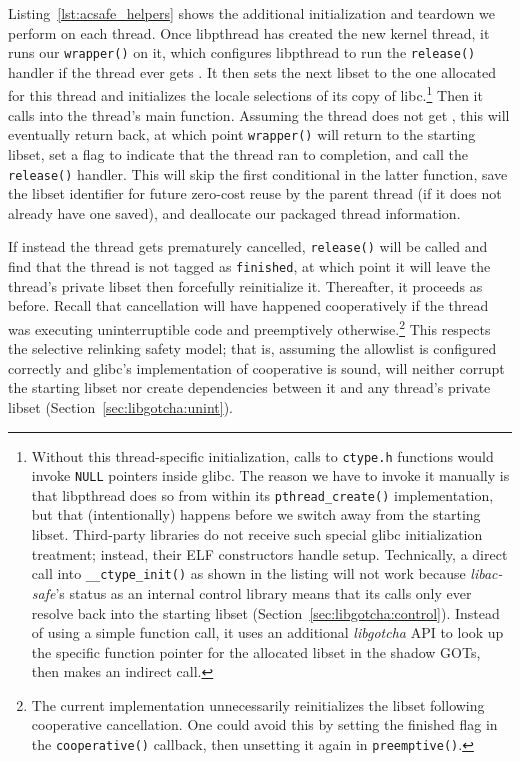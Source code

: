 Listing~\ref{lst:acsafe_helpers} shows the additional initialization and teardown we
perform on each thread.  Once libpthread has created the new kernel thread, it runs
our \texttt{wrapper()} on it, which configures libpthread to run the
\texttt{release()} handler if the thread ever gets .  It then sets the
next
libset to the one allocated for this thread and initializes the locale selections of
its copy of libc.\footnote{Without this thread-specific initialization, calls to
\texttt{ctype.h} functions would invoke \texttt{NULL} pointers inside glibc.  The
reason we have to invoke it manually is that libpthread does so from within its
\texttt{pthread\_create()} implementation, but that (intentionally) happens before we
switch away from the starting libset.  Third-party libraries do not receive such
special glibc initialization treatment; instead, their ELF constructors handle setup.
Technically, a direct call into \texttt{\_\_ctype\_init()} as shown in the listing
will not work because \textit{libac-safe}'s status as an internal control library
means that its calls only ever resolve back into the starting libset
(Section~\ref{sec:libgotcha:control}).  Instead of using a simple function call, it
uses an additional \textit{libgotcha} API to look up the specific function pointer
for the allocated libset in the shadow GOTs, then makes an indirect call.}  Then it
calls into the thread's main function.  Assuming the thread does not get ,
this will eventually return back, at which point \texttt{wrapper()} will return to
the starting libset, set a flag to indicate that the thread ran to completion, and
call the \texttt{release()} handler.  This will skip the first conditional in the
latter function, save the libset identifier for future zero-cost reuse by the parent
thread (if it does not already have one saved), and deallocate our packaged thread
information.

If instead the thread gets prematurely cancelled, \texttt{release()} will be called
and find that the thread is not tagged as \texttt{finished}, at which point it will
leave the thread's private libset then forcefully reinitialize it.  Thereafter, it
proceeds as before.  Recall that cancellation will have happened cooperatively if the
thread was executing uninterruptible code and preemptively otherwise.\footnote{The
current implementation unnecessarily reinitializes the libset following cooperative
cancellation.  One could avoid this by setting the finished flag in the
\texttt{cooperative()} callback, then unsetting it again in \texttt{preemptive()}.}
This respects
the selective relinking safety model; that is, assuming the allowlist is configured
correctly and glibc's implementation of cooperative  is sound,
 will neither corrupt the starting libset nor create dependencies
between it and any thread's private libset (Section~\ref{sec:libgotcha:unint}).

